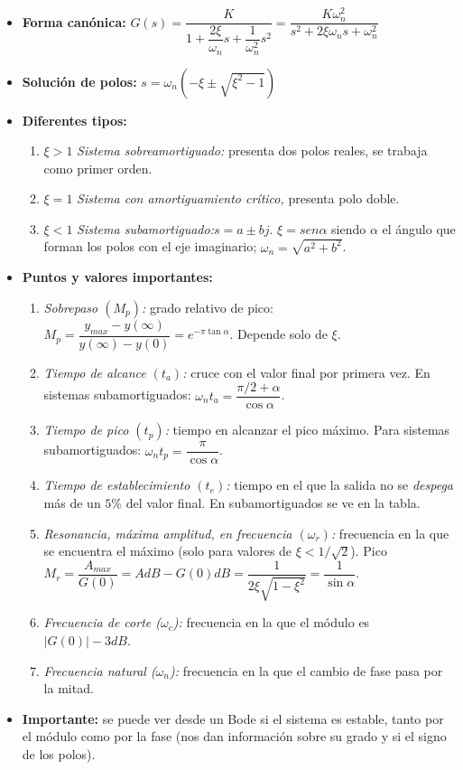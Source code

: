 \documentclass[a4paper, twocolumn, 10pt]{article}
\newlength{\du}
\begin{document}
\begin{itemize}
	\item \textbf{Forma canónica:} $G(s) = \dfrac{K}{1 + \dfrac{2\xi}{\omega_n}s + \dfrac{1}{\omega^2_n}s^2} = \dfrac{K\omega^2_n}{s^2 + 2\xi\omega_ns + \omega^2_n}$
	\item \textbf{Solución de polos:} $s = \omega_n\left(-\xi \pm \sqrt{\xi^2 -1}\right)$
	\item \textbf{Diferentes tipos:}
	\begin{enumerate}
		\item $\xi > 1$ \textit{Sistema sobreamortiguado:} presenta dos polos reales, se trabaja como primer orden.
		\item $\xi = 1$ \textit{Sistema con amortiguamiento crítico,} presenta polo doble.
		\item $\xi < 1$ \textit{Sistema subamortiguado:}$s = a \pm bj$. $\xi = sen\alpha$ siendo $\alpha$ el ángulo que forman los polos con el eje imaginario; $\omega_n = \sqrt{a^2 + b^2}$.
	\end{enumerate}
	\item \textbf{Puntos y valores importantes:}
	\begin{enumerate}
		\item \textit{Sobrepaso $(M_p)$:} grado relativo de pico: $M_p = \dfrac{y_{max}-y(\infty)}{y(\infty)-y(0)} = e^{-\pi\tan\alpha}$. Depende solo de $\xi$.
		\item \textit{Tiempo de alcance $(t_a)$:} cruce con el valor final por primera vez. En sistemas subamortiguados: $\omega_nt_a = \dfrac{\pi/2 +\alpha}{\cos\alpha}$.
		\item \textit{Tiempo de pico $(t_p)$:} tiempo en alcanzar el pico máximo. Para sistemas subamortiguados: $\omega_nt_p = \dfrac{\pi}{\cos\alpha}$.
		\item \textit{Tiempo de establecimiento $(t_e)$:} tiempo en el que la salida no se \textit{despega} más de un $5\%$ del valor final. En subamortiguados se ve en la tabla.
		\item \textit{Resonancia, máxima amplitud, en frecuencia $(\omega_r)$:} frecuencia en la que se encuentra el máximo (solo para valores de $\xi < 1/\sqrt{2}$). Pico $M_r = \dfrac{A_{max}}{G(0)} = AdB - G(0)dB = \dfrac{1}{2\xi\sqrt{1-\xi^2}} = \dfrac{1}{\sin\alpha}$.
		\item \textit{Frecuencia de corte ($\omega_c$):} frecuencia en la que el módulo es $|G(0)| - 3dB$.
		\item \textit{Frecuencia natural ($\omega_n$):} frecuencia en la que el cambio de fase pasa por la mitad.
	\end{enumerate}
	\item \textbf{Importante:} se puede ver desde un Bode si el sistema es estable, tanto por el módulo como por la fase (nos dan información sobre su grado y si el signo de los polos).
\end{itemize}
\end{document}
